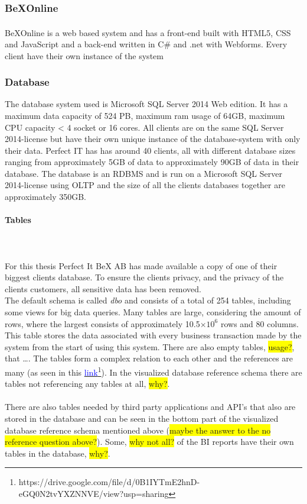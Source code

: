 \documentclass{cslthse-msc}
\newcommand{\hilight}[1]{\colorbox{yellow}{#1}}
\newcommand{\bex}{BeX\textsuperscript{\textregistered}}
\begin{document}
\subsubsection{\bex Online}
\bex Online is a web based system and has a front-end built with HTML5, CSS and JavaScript and a back-end written in C\# and .net with Webforms.
Every client have their own instance of the system 

\subsubsection{Database}
The database system used is Microsoft SQL Server 2014 Web edition. It has a maximum data capacity of 524 PB, maximum ram usage of 64GB, maximum CPU capacity < 4 socket or 16 cores. All clients are on the same SQL Server 2014-license but have their own unique instance of the database-system with only their data.  Perfect IT has has around 40 clients, all with different database sizes ranging from approximately 5GB of data to approximately 90GB of data in their database. The database is an RDBMS and is run on a Microsoft SQL Server 2014-license using OLTP and the size of all the clients databases together are approximately 350GB.

\paragraph*{Tables}\mbox{}\\\\
For this thesis Perfect It BeX AB has made available a copy of one of their biggest clients database. To ensure the clients privacy, and the privacy of the clients customers, all sensitive data has been removed. \\ 
The default schema is called \textit{dbo} and consists of a total of 254 tables, including some views for big data queries. Many tables are large, considering the amount of rows, where the largest consists of approximately 10.5$\times 10^6$ rows and 80 columns. This table stores the data associated with every business transaction made by the system from the start of using this system. There are also empty tables, \hilight{usage?}, that \ldots. The tables form a complex relation to each other and the references are many (as seen in this \href{https://drive.google.com/file/d/0B1IYTmE2hnD-eGQ0N2tvYXZNNVE/view?usp=sharing}{\textcolor{blue}{link}}\footnote{https://drive.google.com/file/d/0B1IYTmE2hnD-eGQ0N2tvYXZNNVE/view?usp=sharing}). In the visualized database reference schema there are tables not referencing any tables at all, \hilight{why?}.\\\\ There are also tables needed by third party applications and API's that also are stored in the database and can be seen in the bottom part of the visualized database reference schema mentioned above (\hilight{maybe the answer to the no reference question above?}). Some, \hilight{why not all?} of the BI reports have their own tables in the database, \hilight{why?}.
\end{document}
